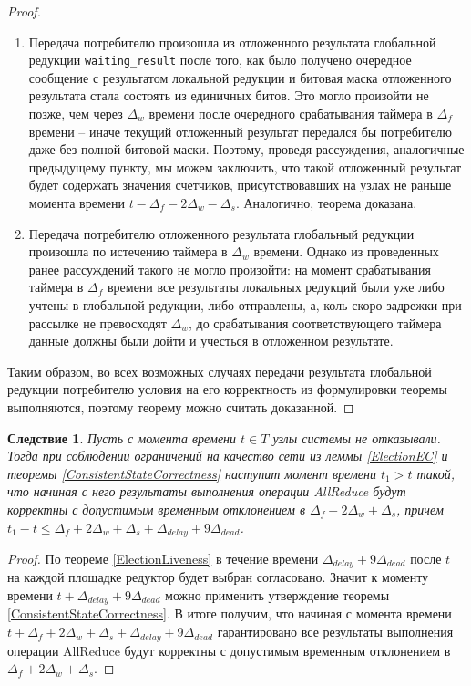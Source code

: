 \documentclass{article}
\theoremstyle{plain}
\theoremstyle{plain}
\newtheorem{consequence}[theorem]{Следствие}
\theoremstyle{plain}
\theoremstyle{plain}
\theoremstyle{definition}
\theoremstyle{remark}
\theoremstyle{plain}
\begin{document}
\begin{proof}
\begin{enumerate}
        \item Передача потребителю произошла из отложенного результата глобальной редукции \texttt{waiting\_result} после того, как было получено очередное сообщение с результатом локальной редукции и битовая маска отложенного результата стала состоять из единичных битов. Это могло произойти не позже, чем через $\Delta_w$ времени после очередного срабатывания таймера в $\Delta_f$ времени -- иначе текущий отложенный результат передался бы потребителю даже без полной битовой маски. Поэтому, проведя рассуждения, аналогичные предыдущему пункту, мы можем заключить, что такой отложенный результат будет содержать значения счетчиков, присутствовавших на узлах не раньше момента времени $t - \Delta_f - 2\Delta_w - \Delta_s$. Аналогично, теорема доказана.
        
        \item Передача потребителю отложенного результата глобальный редукции произошла по истечению таймера в $\Delta_w$ времени. Однако из проведенных ранее рассуждений такого не могло произойти: на момент срабатывания таймера в $\Delta_f$ времени все результаты локальных редукций были уже либо учтены в глобальной редукции, либо отправлены, а, коль скоро задрежки при рассылке не превосходят $\Delta_w$, до срабатывания соответствующего таймера данные должны были дойти и учесться в отложенном результате.
    \end{enumerate}
    
    Таким образом, во всех возможных случаях передачи результата глобальной редукции потребителю условия на его корректность из формулировки теоремы выполняются, поэтому теорему можно считать доказанной.
\end{proof}

\begin{consequence}
    Пусть с момента времени $t \in T$ узлы системы не отказывали. Тогда при соблюдении ограничений на качество сети из леммы \ref{ElectionEC} и теоремы \ref{ConsistentStateCorrectness} наступит момент времени $t_1 > t$ такой, что начиная с него результаты выполнения операции AllReduce будут корректны с допустимым временным отклонением в $\Delta_f + 2\Delta_w + \Delta_s$, причем $t_1 - t \leq \Delta_f + 2\Delta_w + \Delta_s + \Delta_{delay} + 9\Delta_{dead}$.
\end{consequence}
\begin{proof}
    По теореме \ref{ElectionLiveness} в течение времени $\Delta_{delay} + 9\Delta_{dead}$ после $t$ на каждой площадке редуктор будет выбран согласовано. Значит к моменту времени $t + \Delta_{delay} + 9\Delta_{dead}$ можно применить утверждение теоремы \ref{ConsistentStateCorrectness}. В итоге получим, что начиная с момента времени $t + \Delta_f + 2\Delta_w + \Delta_s + \Delta_{delay} + 9\Delta_{dead}$ гарантировано все результаты выполнения операции AllReduce будут корректны с допустимым временным отклонением в $\Delta_f + 2\Delta_w + \Delta_s$.
\end{proof}
\end{document}
